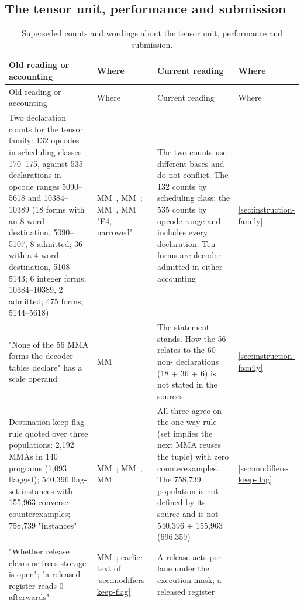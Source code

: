 \subsection*{The tensor unit, performance and submission}\label{sub:tensor-unit-performance}

\begin{xltabular}{\linewidth}{@{}>{\hsize}X>{\hsize}X>{\hsize}X>{\hsize}X@{}}
\caption{Superseded counts and wordings about the tensor unit, performance and submission.}\label{tab:acct-tensor-submission}\\
\toprule
Old reading or accounting & Where & Current reading & Where \\
\midrule
\endfirsthead
{}
\toprule
Old reading or accounting & Where & Current reading & Where \\
\midrule
\endhead
Two declaration counts for the tensor family: 132 opcodes in scheduling
classes 170–175, against 535 declarations in opcode ranges 5090–5618 and
10384–10389 (18 forms with an 8-word destination, 5090–5107, 8 admitted;
36 with a 4-word destination, 5108–5143; 6 integer forms, 10384–10389, 2
admitted; 475  forms, 5144–5618) & MM~, MM~; MM~, MM~ "F4, narrowed" & The two counts use different bases and do not conflict. The 132 counts by
scheduling class; the 535 counts by opcode range and includes every  declaration.
Ten forms are decoder-admitted in either accounting & \cref{sec:instruction-family} \\
"None of the 56 MMA forms the decoder tables declare" has a scale
operand & MM~ & The statement stands. How the 56 relates to the 60 non- declarations
(18 + 36 + 6) is not stated in the sources & \cref{sec:instruction-family} \\
Destination keep-flag rule quoted over three populations: 2,192 MMAs in
140 programs (1,093 flagged); 540,396 flag-set instances with 155,963
converse counterexamples; 758,739 "instances" & MM~; MM~; MM~ & All three agree on the one-way rule (set implies the next MMA reuses the
tuple) with zero counterexamples. The 758,739 population is not defined
by its source and is not 540,396 + 155,963 (696,359) & \cref{sec:modifiers-keep-flag} \\
"Whether release clears or frees storage is open"; "a released register
reads 0 afterwards" & MM~; earlier text of \cref{sec:modifiers-keep-flag} & A release acts per lane under the execution mask; a released register

\end{xltabular}
